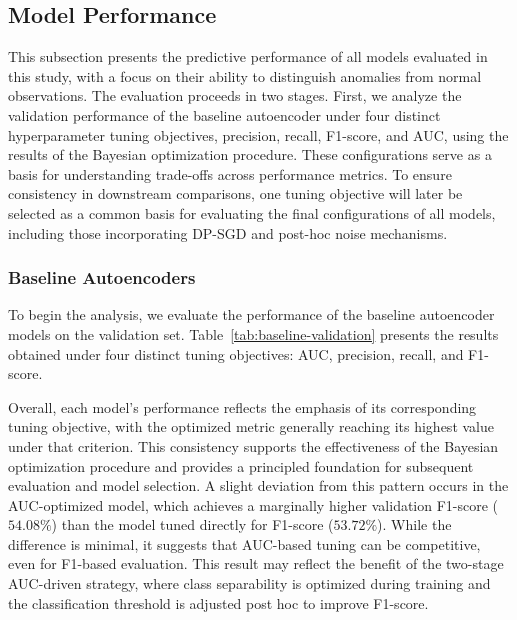 \subsection{Model Performance} \label{s:model_perf}

This subsection presents the predictive performance of all models evaluated in this study, with a focus on their ability to distinguish anomalies from normal observations. The evaluation proceeds in two stages. First, we analyze the validation performance of the baseline autoencoder under four distinct hyperparameter tuning objectives, precision, recall, F1-score, and AUC, using the results of the Bayesian optimization procedure. These configurations serve as a basis for understanding trade-offs across performance metrics. To ensure consistency in downstream comparisons, one tuning objective will later be selected as a common basis for evaluating the final configurations of all models, including those incorporating DP-SGD and post-hoc noise mechanisms. 

\subsubsection{Baseline Autoencoders}

To begin the analysis, we evaluate the performance of the baseline autoencoder models on the validation set. Table~\ref{tab:baseline-validation} presents the results obtained under four distinct tuning objectives: AUC, precision, recall, and F1-score.

Overall, each model’s performance reflects the emphasis of its corresponding tuning objective, with the optimized metric generally reaching its highest value under that criterion. This consistency supports the effectiveness of the Bayesian optimization procedure and provides a principled foundation for subsequent evaluation and model selection. A slight deviation from this pattern occurs in the AUC-optimized model, which achieves a marginally higher validation F1-score ($54.08\%$) than the model tuned directly for F1-score ($53.72\%$). While the difference is minimal, it suggests that AUC-based tuning can be competitive, even for F1-based evaluation. This result may reflect the benefit of the two-stage AUC-driven strategy, where class separability is optimized during training and the classification threshold is adjusted post hoc to improve F1-score.



